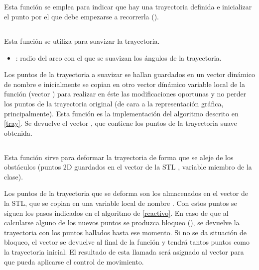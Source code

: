 \subsection{}

\noindent
{}

\noindent
Esta función se emplea para indicar que hay una trayectoria definida e inicializar el punto por el que debe empezarse a recorrerla ().

\subsection{}

\noindent
{}

\noindent
Esta función se utiliza para suavizar la trayectoria.
\begin{itemize}
  \item {}: radio del arco con el que se suavizan los ángulos de la trayectoria.
\end{itemize}

\noindent
Los puntos de la trayectoria a suavizar se hallan guardados en un vector dinámico de nombre  e inicialmente se copian en otro vector dínámico variable local de la función (vector ) para realizar en éste las modificaciones oportunas y no perder los puntos de la trayectoria original (de cara a la representación gráfica, principalmente).
Esta función es la implementación del algoritmo descrito en \ref{tray}. Se devuelve el vector , que contiene los puntos de la trayectoria suave obtenida.

\subsection{}

\noindent
{}

\noindent
Esta función sirve para deformar la trayectoria de forma que se aleje de los obstáculos (puntos 2D guardados en el vector de la STL , variable miembro de la clase).

\noindent
Los puntos de la trayectoria que se deforma son los almacenados en el vector  de la STL, que se copian en una variable local de nombre . Con estos puntos se siguen los pasos indicados en el algoritmo de \ref{reactivo}. En caso de que al calcularse alguno de los nuevos puntos se produzca bloqueo (), se devuelve la trayectoria  con los puntos hallados hasta ese momento. Si no se da situación de bloqueo, el vector  se devuelve al final de la función y tendrá tantos puntos como la trayectoria inicial. El resultado de esta llamada será asignado al vector  para que pueda aplicarse el control de movimiento.

